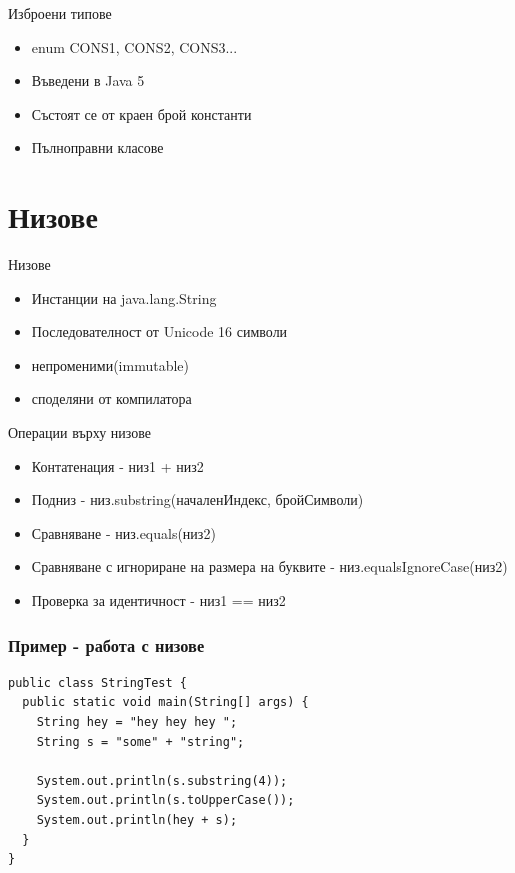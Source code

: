 \documentclass{beamer}
\begin{document}
\begin{frame}{Изброени типове}
  \transdissolve
  \begin{itemize}
  \item enum {CONS1, CONS2, CONS3...} \pause
  \item Въведени в Java 5 \pause
  \item Състоят се от краен брой константи \pause
  \item Пълноправни класове 
  \end{itemize}
\end{frame}

\section{Низове}
\begin{frame}{Низове}
  \transdissolve
  \begin{itemize}
  \item Инстанции на java.lang.String \pause
  \item Последователност от Unicode 16 символи \pause
  \item непроменими(immutable) \pause
  \item споделяни от компилатора \pause
  \end{itemize}
\end{frame}

\begin{frame}{Операции върху низове}
  \transdissolve
  \begin{itemize}
  \item Контатенация - низ1 + низ2 \pause
  \item Подниз - низ.substring(началенИндекс, бройСимволи) \pause
  \item Сравняване - низ.equals(низ2) \pause
  \item Сравняване с игнориране на размера на буквите -
    низ.equalsIgnoreCase(низ2) \pause
  \item Проверка за идентичност - низ1 == низ2
  \end{itemize}
\end{frame}

\begin{frame}[fragile]
  \frametitle{Пример - работа с низове}
  \transdissolve
\begin{lstlisting}
public class StringTest {
  public static void main(String[] args) {
    String hey = "hey hey hey ";
    String s = "some" + "string";

    System.out.println(s.substring(4));
    System.out.println(s.toUpperCase());
    System.out.println(hey + s);
  }
}  
\end{lstlisting}
\end{frame}
\end{document}

